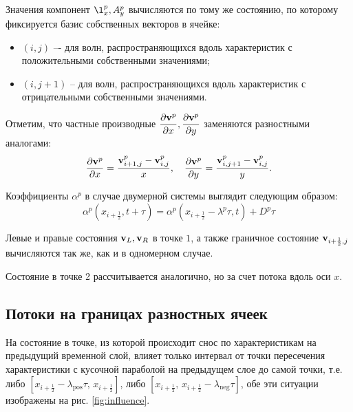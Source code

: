 \documentclass[12pt,a4paper]{article}
\newcommand{\picref}[1]{рис. \ref{#1}}
\newcommand{\half}{\frac{1}{2}}
\newcommand{\dpartial}[2]{\dfrac{ \partial #1 }{ \partial #2 }}
\begin{document}
    Значения компонент $ \l_x^p, A_y^p $ вычисляются по тому же состоянию, по которому фиксируется базис собственных векторов в ячейке: 
    \begin{itemize}
        \item $(i, j)$ –- для волн, распространяющихся вдоль характеристик с положительными собственными значениями;
        \item $(i, j + 1)$ -- для волн, распространяющихся вдоль характеристик с отрицательными собственными значениями.
    \end{itemize}

    Отметим, что частные производные $\dpartial{\bold v^p}{x}, \dpartial{\bold v^p}{y}$ заменяются разностными аналогами: 
    \[
        \dpartial{\bold v^p}{x} = \dfrac{\bold v_{i+1, j}^p - \bold v_{i, j}^p}{\Delta x}, \quad \dpartial{\bold v^p}{y} = \dfrac{\bold v_{i, j + 1}^p - \bold v_{i, j}^p}{\Delta y}.  
    \]

    Коэффициенты $\alpha^p$ в случае двумерной системы выглядит следующим образом:
    \begin{equation}
        \label{shift:2d}
        \alpha^p(x_{i + \half}, t + \tau) = \alpha^p(x_{i + \half} - \lambda^p \tau, t) + D^p \tau
    \end{equation}

    Левые и правые состояния $\bold v_L, \bold v_R$ в точке $1$, а также граничное состояние $ \bold v_{i + \half, j} $ вычисляются так же, как и в одномерном случае.

    Состояние в точке 2 рассчитывается аналогично, но за счет потока вдоль оси $x$.

    \subsection{Потоки на границах разностных ячеек}

    На состояние в точке, из которой происходит снос по характеристикам на предыдущий временной слой, влияет только интервал от точки пересечения характеристики с кусочной параболой на предыдущем слое до самой точки, т.е. либо $ [x_{i + \half} - \lambda_{\text{pos}} \tau,\, x_{i + \half}] $, либо $[x_{i + \half},\, x_{i + \half} - \lambda_{\text{neg}} \tau] $, обе эти ситуации изображены на \picref{fig:influence}. 

    \pagebreak
\end{document}
